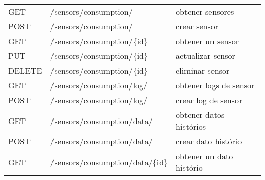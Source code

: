 \begin{table}[H]
\begin{tabular}{l l l}
        \midrule
        GET             & /sensors/consumption/          & obtener sensores             \\
        POST            & /sensors/consumption/          & crear sensor                 \\
        GET             & /sensors/consumption/\{id\}      & obtener un sensor            \\
        PUT             & /sensors/consumption/\{id\}      & actualizar sensor            \\
        DELETE          & /sensors/consumption/\{id\}      & eliminar sensor              \\
        \midrule
        GET             & /sensors/consumption/log/      & obtener logs de sensor       \\
        POST            & /sensors/consumption/log/      & crear log de sensor          \\
        \midrule
        GET             & /sensors/consumption/data/     & obtener datos histórios      \\
        POST            & /sensors/consumption/data/     & crear dato histório          \\
        GET             & /sensors/consumption/data/\{id\} & obtener un dato histório     \\
        \bottomrule
        \hline
    \end{tabular}
    \label{tab:endpoints2}
\end{table}

